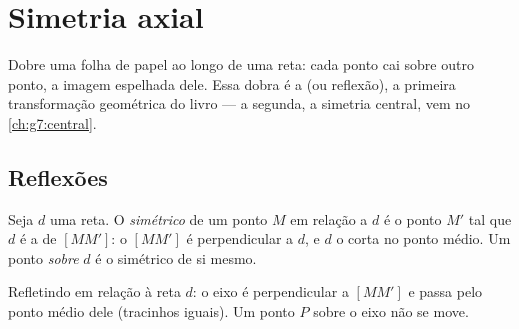 \chapter{Simetria axial}\label{ch:g6:symmetry}

Dobre uma folha de papel ao longo de uma reta: cada ponto cai sobre
outro ponto, a imagem espelhada dele. Essa dobra é a \emph{} (ou reflexão), a primeira transformação geométrica do livro ---
a segunda, a simetria central, vem no \cref{ch:g7:central}.

\section{Reflexões}

\begin{definition}\label{def:g6:symmetry:def}
Seja $d$ uma reta. O \emph{simétrico} de um ponto
$M$ em relação a $d$ é o ponto $M'$ tal que $d$ é a  de
$[MM']$: o  $[MM']$ é perpendicular a $d$, e $d$ o corta no
ponto médio. Um ponto \emph{sobre} $d$ é o simétrico de si mesmo.
\end{definition}

\begin{omfigure}

{\small Refletindo em relação à reta $d$: o eixo é perpendicular a
$[MM']$ e passa pelo ponto médio dele (tracinhos iguais). Um ponto $P$
sobre o eixo não se move.}
\end{omfigure}

